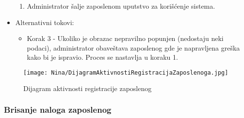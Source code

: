 \documentclass[a4paper]{article}
\begin{document}
\begin{itemize}
\begin{enumerate}
            \item Administrator šalje zaposlenom uputstvo za korišćenje sistema.
        \end{enumerate}
    \item Alternativni tokovi:
        \begin{itemize}
            \item Korak 3 - Ukoliko je obrazac nepravilno popunjen (nedostaju neki podaci), administrator obaveštava zaposlenog gde je napravljena greška kako bi je ispravio. Proces se nastavlja u koraku 1.
        \end{itemize}
\end{itemize}

\begin{figure}[H]
    \centering
    \texttt{[image: Nina/DijagramAktivnostiRegistracijaZaposlenoga.jpg]}
    \caption{Dijagram aktivnosti registracije zaposlenog}
    \label{fig:RegistracijaZ}
\end{figure}


\subsubsection{Brisanje naloga zaposlenog}
\end{document}
